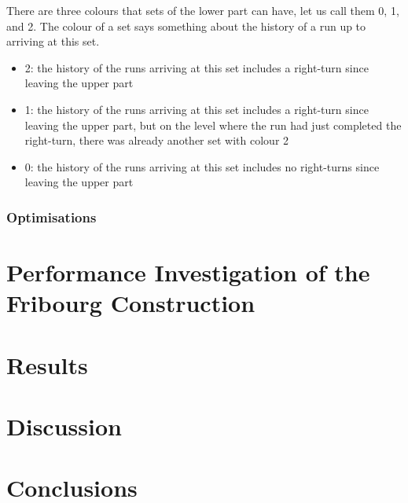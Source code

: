 \documentclass[a4paper]{report}
\begin{document}
There are three colours that sets of the lower part can have, let us call them 0, 1, and 2. The colour of a set says something about the history of a run up to arriving at this set.

\begin{itemize}
\item 2: the history of the runs arriving at this set includes a right-turn since leaving the upper part
\item 1: the history of the runs arriving at this set includes a right-turn since leaving the upper part, but on the level where the run had just completed the right-turn, there was already another set with colour 2
\item 0: the history of the runs arriving at this set includes no right-turns since leaving the upper part
\end{itemize}



\subsection{Optimisations}
\label{optimisations}



\chapter{Performance Investigation of the Fribourg Construction}

\chapter{Results}
\label{results}

\chapter{Discussion}

\chapter{Conclusions}




\end{document}
